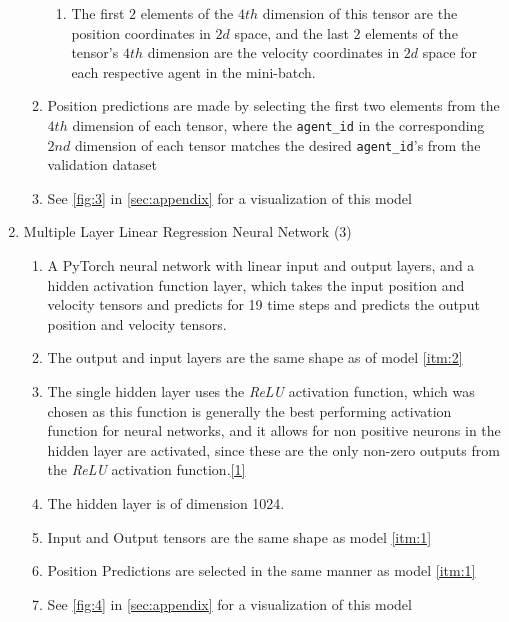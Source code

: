 \documentclass{article}
\begin{document}
\begin{enumerate}
\begin{enumerate}
\begin{enumerate}
            \item The first $2$ elements of the $4th$ dimension of this tensor are the position coordinates in $2d$ space, and the last $2$ elements of the 
            tensor's $4th$ dimension are the velocity coordinates in $2d$ space for each respective agent in the mini-batch.
          \end{enumerate}
          \item Position predictions are made by selecting the first two elements from the $4th$ dimension of each tensor, where the 
                \texttt{agent\_id} in the corresponding $2nd$ dimension of each tensor matches the desired \texttt{agent\_id}'s from the 
                validation dataset
          \label{itm:6}
          \item See \autoref{fig:3} in \autoref{sec:appendix} for a visualization of this model 
        \end{enumerate}

        \item Multiple Layer Linear Regression Neural Network (3) 
        \label{itm:3}
        \begin{enumerate}
          \item A PyTorch neural network with linear input and output layers, and a hidden activation function layer,
                 which takes the input position and velocity tensors and predicts
                for 19 time steps and predicts the output position and velocity tensors.
          \item The output and input layers are the same shape as of model \ref{itm:2}
          \item The single hidden layer uses the \emph{ReLU} activation function, which was chosen as this function is generally the best performing
                activation function for neural networks, and it allows for non positive neurons in the hidden layer are activated, since these
                are the only non-zero outputs from the \emph{ReLU} activation function.\hyperref[bibliography]{[1]}
          \item The hidden layer is of dimension 1024.
          \item Input and Output tensors are the same shape as model \ref{itm:1}
          \item Position Predictions are selected in the same manner as model \ref{itm:1}
          \item See \autoref{fig:4} in \autoref{sec:appendix} for a visualization of this model 
        \end{enumerate}


\end{enumerate}
\end{document}
